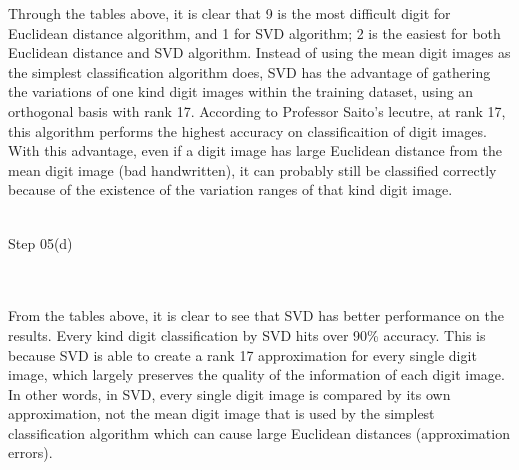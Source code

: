\documentclass{article}
\begin{document}
Through the tables above, it is clear that 9 is the most difficult digit for Euclidean distance algorithm, and 1 for SVD algorithm; 2 is the easiest for both Euclidean distance and SVD algorithm. Instead of using the mean digit images as the simplest classification algorithm does, SVD has the advantage of gathering the variations of one kind digit images within the training dataset, using an orthogonal basis with rank 17. According to Professor Saito's lecutre, at rank 17, this algorithm performs the highest accuracy on classificaition of digit images. With this advantage, even if a digit image has large Euclidean distance from the mean digit image (bad handwritten), it can probably still be classified correctly because of the existence of the variation ranges of that kind digit image.
\\\\\begin{large}Step 05(d)\end{large}
\\\\From the tables above, it is clear to see that SVD has better performance on the results. Every kind digit classification by SVD hits over 90\% accuracy. This is because SVD is able to create a rank 17 approximation for every single digit image, which largely preserves the quality of the information of each digit image. In other words, in SVD, every single digit image is compared by its own approximation, not the mean digit image that is used by the simplest classification algorithm which can cause large Euclidean distances (approximation errors).
\end{document}
